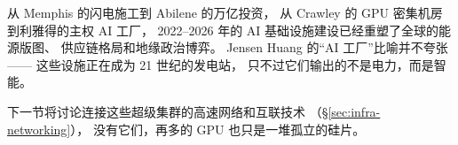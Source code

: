 从 Memphis 的闪电施工到 Abilene 的万亿投资，
从 Crawley 的 GPU 密集机房到利雅得的主权 AI 工厂，
2022--2026 年的 AI 基础设施建设已经重塑了全球的能源版图、
供应链格局和地缘政治博弈。
Jensen Huang 的``AI 工厂''比喻并不夸张——
这些设施正在成为 21 世纪的发电站，
只不过它们输出的不是电力，而是智能。

下一节将讨论连接这些超级集群的高速网络和互联技术
（\S\ref{sec:infra-networking}），
没有它们，再多的 GPU 也只是一堆孤立的硅片。
